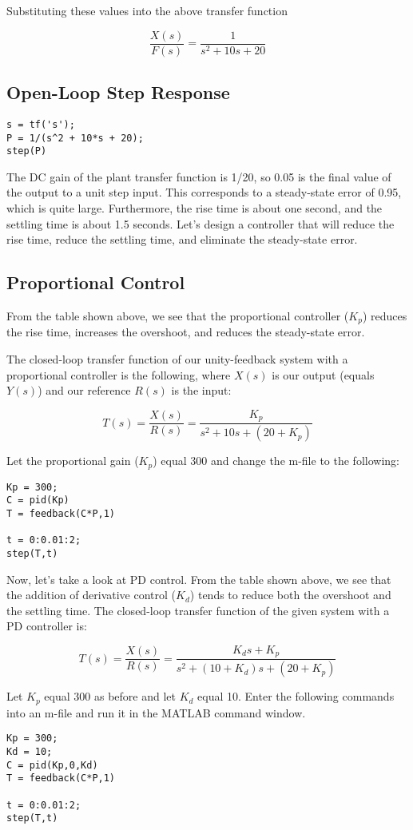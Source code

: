 \documentclass{report}
\begin{document}
Substituting these values into the above transfer function

\[\frac{X(s)}{F(s)} = \frac{1}{s^2 + 10s + 20} \]
\subsection{Open-Loop Step Response}
\begin{lstlisting}
s = tf('s');
P = 1/(s^2 + 10*s + 20);
step(P)
\end{lstlisting}
The DC gain of the plant transfer function is 1/20, so 0.05 is the final value of the output to a unit step input. This corresponds to a steady-state error of 0.95, which is quite large. Furthermore, the rise time is about one second, and the settling time is about 1.5 seconds. Let's design a controller that will reduce the rise time, reduce the settling time, and eliminate the steady-state error.
\subsection{Proportional Control}
From the table shown above, we see that the proportional controller ($K_p$) reduces the rise time, increases the overshoot, and reduces the steady-state error.

The closed-loop transfer function of our unity-feedback system with a proportional controller is the following, where $X(s)$ is our output (equals $Y(s)$) and our reference $R(s)$ is the input:

\[T(s) = \frac{X(s)}{R(s)} = \frac{K_p}{s^2 + 10s + (20 + K_p)} \]


Let the proportional gain ($K_p$) equal 300 and change the m-file to the following:
\begin{lstlisting}
Kp = 300;
C = pid(Kp)
T = feedback(C*P,1)

t = 0:0.01:2;
step(T,t)

\end{lstlisting}
Now, let's take a look at PD control. From the table shown above, we see that the addition of derivative control ($K_d$) tends to reduce both the overshoot and the settling time. The closed-loop transfer function of the given system with a PD controller is:

\[T(s) = \frac{X(s)}{R(s)} = \frac{K_d s + K_p}{s^2 + (10 + K_d) s + (20 + K_p)} \]

Let $K_p$ equal 300 as before and let $K_d$ equal 10. Enter the following commands into an m-file and run it in the MATLAB command window.
\begin{lstlisting}
Kp = 300;
Kd = 10;
C = pid(Kp,0,Kd)
T = feedback(C*P,1)

t = 0:0.01:2;
step(T,t)
\end{lstlisting}
\end{document}
